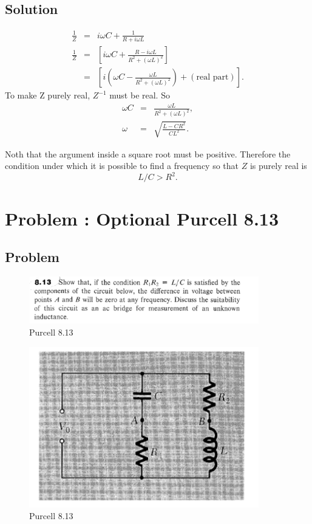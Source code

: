 \documentclass[solutions]{esg8022pset}
\begin{document}
\subsection{Solution}
\begin{eqnarray}
\frac{1}{Z} &=& i\omega C + \frac{1}{R+i\omega L}\nonumber\\
\frac{1}{Z} &=&\left[i\omega C+\frac{R-i\omega L}{R^2+(\omega
L)^2}\right]\nonumber\\
&=& \left[ i(\omega C-\frac{\omega L}{R^2+(\omega
L)^2})+(\textrm{real part})\right].
\end{eqnarray}
To make Z purely real, $Z^{-1}$ must be real.  So
\begin{eqnarray}
\omega C &=& \frac{\omega L}{R^2+(\omega L)^2},\\
\omega &=& \sqrt{\frac{L-CR^2}{CL^2}}.
\end{eqnarray}

Noth that the argument inside a square root must be positive.
Therefore the condition under which it is possible to find
a frequency so that $Z$ is purely real is
\begin{equation}
L/C>R^2.
\end{equation}
\section{Problem \thesection:  Optional Purcell 8.13}
\subsection{Problem}

\begin{figure}[H]
    \centering
    \includegraphics[width = 10cm]{pu813}
    \caption{Purcell 8.13}
  \end{figure}

  \begin{figure}[H]
    \centering
    \includegraphics[width = 10cm]{figpu813}
    \caption{Purcell 8.13}
  \end{figure}
\end{document}
